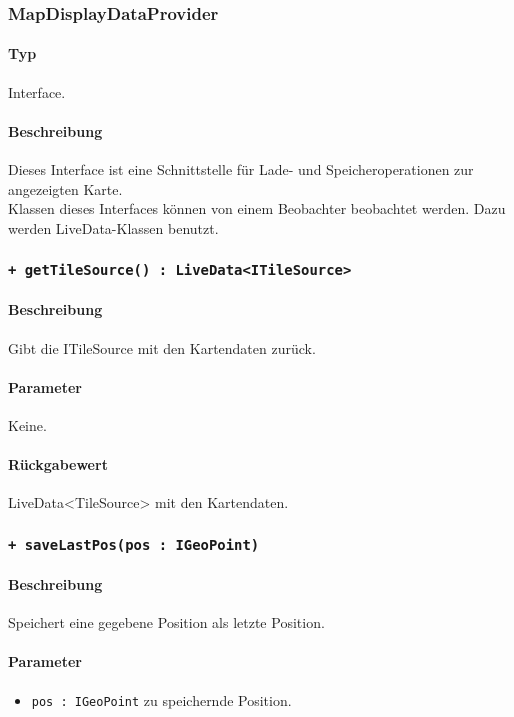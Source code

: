 \subsubsection{MapDisplayDataProvider}
\paragraph*{Typ}
Interface.
\paragraph*{Beschreibung}
Dieses Interface ist eine Schnittstelle für Lade- und Speicheroperationen zur angezeigten Karte.\\
Klassen dieses Interfaces können von einem Beobachter beobachtet werden. Dazu werden 
LiveData-Klassen benutzt.

\subsubsection*{\texttt{+ getTileSource() : LiveData<ITileSource>}}%
\paragraph*{Beschreibung}
Gibt die ITileSource mit den Kartendaten zurück.
\paragraph*{Parameter}
Keine.
\paragraph*{Rückgabewert}
LiveData<TileSource> mit den Kartendaten.

\subsubsection*{\texttt{+ saveLastPos(pos : IGeoPoint)}}%
\paragraph*{Beschreibung}
Speichert eine gegebene Position als letzte Position.
\paragraph*{Parameter}
\begin{itemize}
    \item \texttt{pos : IGeoPoint} zu speichernde Position.
\end{itemize}
